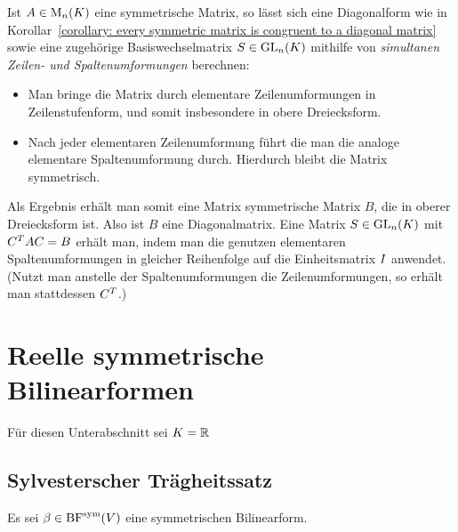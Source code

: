 Ist $A \in \operatorname{M}_{n}(K)$ eine symmetrische Matrix, so lässt sich eine Diagonalform wie in Korollar~\ref{corollary: every symmetric matrix is congruent to a diagonal matrix} sowie eine zugehörige Basiswechselmatrix $S \in \operatorname{GL}_{n}(K)$ mithilfe von \emph{simultanen Zeilen- und Spaltenumformungen} berechnen:
\begin{itemize}
  \item
    Man bringe die Matrix durch elementare Zeilenumformungen in Zeilenstufenform, und somit insbesondere in obere Dreiecksform.
  \item
    Nach jeder elementaren Zeilenumformung führt die man die analoge elementare Spaltenumformung durch.
    Hierdurch bleibt die Matrix symmetrisch.
\end{itemize}
Als Ergebnis erhält man somit eine Matrix symmetrische Matrix $B$, die in oberer Dreiecksform ist.
Also ist $B$ eine Diagonalmatrix.
Eine Matrix $S \in \operatorname{GL}_{n}(K)$ mit $C^T A C = B$ erhält man, indem man die genutzen elementaren Spaltenumformungen in gleicher Reihenfolge auf die Einheitsmatrix $I$ anwendet.
(Nutzt man anstelle der Spaltenumformungen die Zeilenumformungen, so erhält man stattdessen $C^T$.)






\section{Reelle symmetrische Bilinearformen}

Für diesen Unterabschnitt sei $K = \mathbb{R}$



\subsection{Sylvesterscher Trägheitssatz}

Es sei $\beta \in \operatorname{BF}^{\operatorname{sym}}(V)$ eine symmetrischen Bilinearform.

